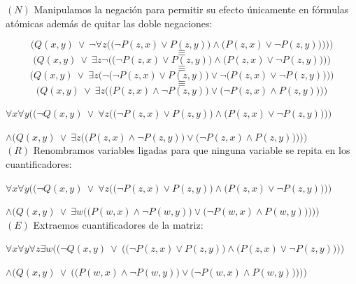 \documentclass[12pt,letterpaper]{article}
\begin{document}
\begin{enumerate}
  $(N)$ Manipulamos la negaci\'{o}n para permitir su efecto \'{u}nicamente en f\'{o}rmulas at\'{o}micas adem\'{a}s de quitar las doble negaciones:

  \[
  \bigg( Q(x,y) \: \lor \: \neg \forall z \Big( \big(\neg P(z,x) \lor P(z,y) \big) \land \big(P(z,x) \lor \neg P(z,y) \big) \Big) \bigg)\Bigg)
  \]
  \[
  \equiv
  \]
  \[
  \bigg( Q(x,y) \: \lor \: \exists z \neg \Big( \big(\neg P(z,x) \lor P(z,y) \big) \land \big(P(z,x) \lor \neg P(z,y) \big) \Big) \bigg)
  \]
  \[
  \equiv
  \]
  \[
  \bigg( Q(x,y) \: \lor \: \exists z \Big( \neg \big(\neg P(z,x) \lor P(z,y) \big) \lor \neg \big(P(z,x) \lor \neg P(z,y) \big) \Big) \bigg)
  \]
  \[
  \equiv
  \]
  \[
  \bigg( Q(x,y) \: \lor \: \exists z \Big( \big(P(z,x) \land \neg P(z,y) \big) \lor \big(\neg P(z,x) \land P(z,y) \big) \Big) \bigg)
  \]

  \quad {} $\forall x \forall y \Bigg (\bigg(\neg Q(x,y) \: \lor \: \forall z \Big( \big(\neg P(z,x) \lor P(z,y) \big) \land \big(P(z,x) \lor \neg P(z,y) \big) \Big)\bigg)$

  \hspace{2cm} $\land \bigg( Q(x,y) \: \lor \: \exists z \Big( \big(P(z,x) \land \neg P(z,y) \big) \lor \big(\neg P(z,x) \land P(z,y) \big) \Big) \bigg)\Bigg)$
  \\
  
  $(R)$ Renombramos variables ligadas para que ninguna variable se repita en los cuantificadores:

  \quad {} $\forall x \forall y \Bigg (\bigg(\neg Q(x,y) \: \lor \: \forall z \Big( \big(\neg P(z,x) \lor P(z,y) \big) \land \big(P(z,x) \lor \neg P(z,y) \big) \Big)\bigg)$

  \hspace{2cm} $\land \bigg( Q(x,y) \: \lor \: \exists w \Big( \big(P(w,x) \land \neg P(w,y) \big) \lor \big(\neg P(w,x) \land P(w,y) \big) \Big) \bigg)\Bigg)$
  \\

  $(E)$ Extraemos cuantificadores de la matriz:

  \quad {} $\forall x \forall y \forall z \exists w \Bigg (\bigg(\neg Q(x,y) \: \lor \: \Big( \big(\neg P(z,x) \lor P(z,y) \big) \land \big(P(z,x) \lor \neg P(z,y) \big) \Big)\bigg)$

  \hspace{3cm} $\land \bigg( Q(x,y) \: \lor \: \Big( \big(P(w,x) \land \neg P(w,y) \big) \lor \big(\neg P(w,x) \land P(w,y) \big) \Big) \bigg)\Bigg)$
  \\


\end{enumerate}
\end{document}
